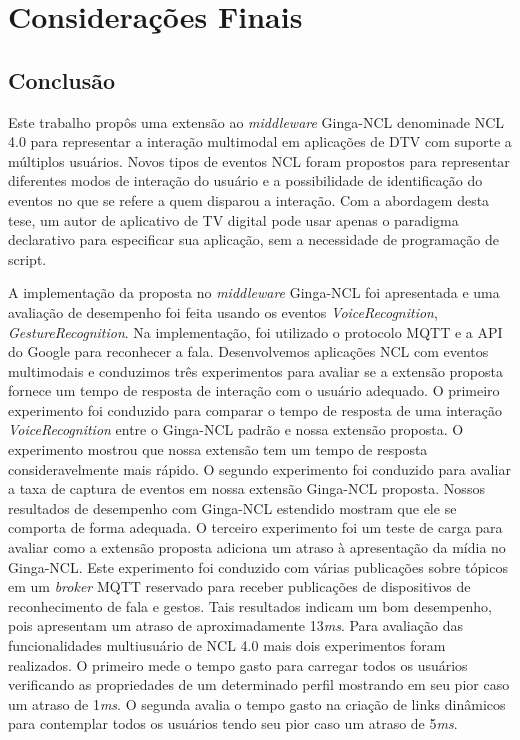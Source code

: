 \chapter{Considerações Finais} \label{cap:cap8}

\section{Conclusão}
\label{sec:conclusão}

Este trabalho propôs uma extensão ao \textit{middleware} Ginga-NCL denominade NCL 4.0 para representar a interação multimodal em aplicações de DTV com suporte a múltiplos usuários. Novos tipos de eventos NCL foram propostos para representar diferentes modos de interação do usuário e a possibilidade de identificação do eventos no que se refere a quem disparou a interação. Com a abordagem desta tese, um autor de aplicativo de TV digital pode usar apenas o paradigma declarativo para especificar sua aplicação, sem a necessidade de programação de script.

A implementação da proposta no \textit{middleware} Ginga-NCL foi apresentada e uma avaliação de desempenho foi feita usando os eventos \textit{VoiceRecognition}, \textit{GestureRecognition}. Na implementação, foi utilizado o protocolo MQTT e a API do Google para reconhecer a fala. Desenvolvemos aplicações NCL com eventos multimodais e conduzimos três experimentos para avaliar se a extensão proposta fornece um tempo de resposta de interação com o usuário adequado. O primeiro experimento foi conduzido para comparar o tempo de resposta de uma interação \textit{VoiceRecognition} entre o Ginga-NCL padrão e nossa extensão proposta. O experimento mostrou que nossa extensão tem um tempo de resposta consideravelmente mais rápido. O segundo experimento foi conduzido para avaliar a taxa de captura de eventos em nossa extensão Ginga-NCL proposta. Nossos resultados de desempenho com Ginga-NCL estendido mostram que ele se comporta de forma adequada. O terceiro experimento foi um teste de carga para avaliar como a extensão proposta adiciona um atraso à apresentação da mídia no Ginga-NCL. Este experimento foi conduzido com várias publicações sobre tópicos em um \textit{broker} MQTT reservado para receber publicações de dispositivos de reconhecimento de fala e gestos. Tais resultados indicam um bom desempenho, pois apresentam um atraso de aproximadamente 13\textit{ms}. Para avaliação das funcionalidades multiusuário de NCL 4.0 mais dois experimentos foram realizados. O primeiro mede o tempo gasto para carregar todos os usuários verificando as propriedades de um determinado perfil mostrando em seu pior caso um atraso de 1\textit{ms}. O segunda avalia o tempo gasto na criação de links dinâmicos para contemplar todos os usuários tendo seu pior caso um atraso de 5\textit{ms}.

